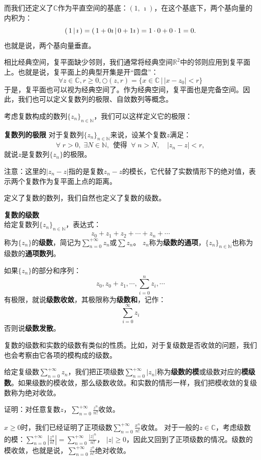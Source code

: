\documentclass[12pt,UTF8,fontset=none]{ctexbook}
\begin{document}
而我们还定义了$\mathbb{C}$作为平直空间的基底：$(1,\, \imath)$，在这个基底下，两个基向量的内积为：
$$ \displaystyle\left( \,1 \,\middle\vert \,\imath \,\right) = \displaystyle\left( \,1 + 0\imath \,\middle\vert \,0 + 1\imath \,\right) = 1\cdot 0 + 0\cdot 1 = 0.$$
也就是说，两个基向量垂直。

相比经典空间，复平面缺少邻则，我们通常将经典空间$\mathbb{R}^2$中的邻则应用到复平面上。也就是说，复平面上的典型开集是开“圆盘”：
$$ \forall z \in \mathbb{C}, r\geqslant 0,  \bigcirc(z, r) = \{x \in \mathbb{C} \, | \, |x - z_0| < r \} $$
于是，复平面也可以视为经典空间了。作为经典空间，复平面也是完备空间。因此，我们也可以定义复数列的极限、自敛数列等概念。

考虑复数构成的数列$\{z_n\}_{n\in\mathbb{N}}$，我们可以这样定义它的极限：
\begin{df}{\textbf{复数列的极限}}
    对于复数列$\{z_n\}_{n\in\mathbb{N}}$来说，设某个复数$z$满足：
    $$ \forall \;r > 0 ,\; \exists N\in \mathbb{N},\;\, \mbox{使得}\;\; \forall \; n>N, \quad | z_n - z | < r, $$
    就说$z$是复数列$\{z_n\}$的极限。

\end{df}

注意：这里的$|z_n - z|$指的是复数$z_n - z$的模长，它代替了实数情形下的绝对值，表示两个复数作为复平面上点的距离。

定义了复数的数列，我们自然也定义了复数的级数。
\begin{df}{\textbf{复数的级数}}
    \mbox{} \\
    给定复数列$\{z_n\}_{n\in\mathbb{N}}$，表达式：
    $$ z_0 + z_1 + z_2 + \cdots + z_n + \cdots $$
    称为$\{z_n\}$的\textbf{级数}，简记为$\sum_{n=0}^{+\infty} z_n$或$\sum z_n$。
    $z_n$称为\textbf{级数的通项}，$\{z_n\}_{n\in\mathbb{N}}$也称为级数的\textbf{通项数列}。
    
    如果$\{z_n\}$的部分和序列：
    $$ z_0, z_0 + z_1, \cdots , \sum_{i=0}^n z_i, \cdots $$
    有极限，就说\textbf{级数收敛}，其极限称为\textbf{级数和}，记作：
    $$ \sum_{i=0}^\infty z_i $$
    否则说\textbf{级数发散}。
    
\end{df}

复数的级数和实数的级数有类似的性质。比如，对于复级数是否收敛的问题，我们也会考察由它各项的模构成的级数。

给定复级数$\sum_{n=0}^{+\infty} z_n$，我们把正项级数$\sum_{n=0}^{+\infty} |z_n|$称为\textbf{级数的模}或级数对应的\textbf{模级数}。如果级数的模收敛，那么级数收敛。和实数的情形一样，我们把模收敛的复级数称为绝对收敛。

\begin{et}
    证明：对任意复数$z$，$\sum_{n=0}^{+\infty}\frac{z^{n}}{n!}$收敛。
\end{et}
\begin{so}
    $x\geqslant 0$时，我们已经证明了正项级数$\sum_{n=0}^{+\infty}\frac{x^{n}}{n!}$收敛。
    对于一般的$z\in\mathbb{C}$，考虑级数的模：$\sum_{n=0}^{+\infty}\left|\frac{z^{n}}{n!}\right| = \sum_{n=0}^{+\infty}\frac{|z|^{n}}{n!}$，
    $|z|\geqslant 0$，因此又回到了正项级数的情况。级数的模收敛，也就是说，$\sum_{n=0}^{+\infty}\frac{z^{n}}{n!}$绝对收敛。
\end{so}
\end{document}
